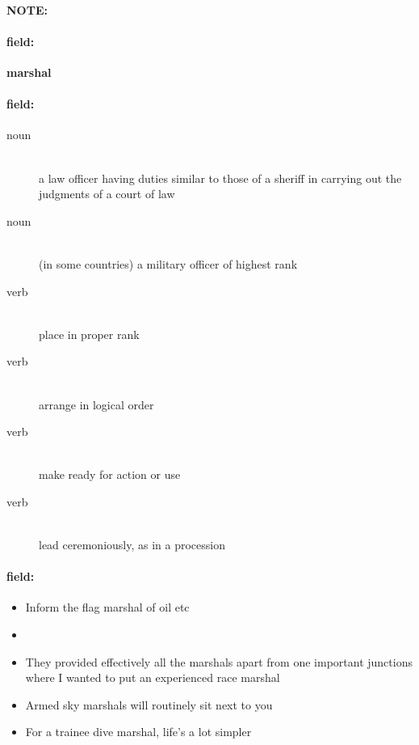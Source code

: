\documentclass[12pt]{article}
\newenvironment{note}{\paragraph{NOTE:}}{}
\newenvironment{field}{\paragraph{field:}}{}
\begin{document}
\begin{note}
\begin{field}
\textbf{\large marshal}
\end{field}


\begin{field}
\begin{description}
\item[noun] \hfill \\ 
a law officer having duties similar to those of a sheriff in carrying out the judgments of a court of law

\item[noun] \hfill \\ 
(in some countries) a military officer of highest rank

\item[verb] \hfill \\ 
place in proper rank

\item[verb] \hfill \\ 
arrange in logical order

\item[verb] \hfill \\ 
make ready for action or use

\item[verb] \hfill \\ 
lead ceremoniously, as in a procession

\end{description}
\end{field}

\begin{field}
\begin{itemize}
\item Inform the flag marshal of oil etc
\item 
\item They provided effectively all the marshals apart from one important junctions where I wanted to put an experienced race marshal
\item Armed sky marshals will routinely sit next to you
\item For a trainee dive marshal, life's a lot simpler
\end{itemize}
\end{field}
\end{note}
\end{document}
